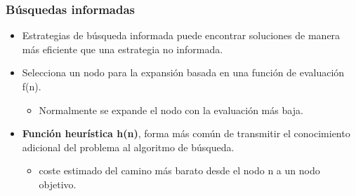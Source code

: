 \documentclass[xcolor=table]{beamer}
\begin{document}
\begin{frame} \frametitle{Búsquedas informadas} \small
\begin{itemize}
\item Estrategias de búsqueda informada puede encontrar soluciones de manera más eficiente que una estrategia no informada.

\item Selecciona un nodo para la expansión basada en una función de evaluación f(n).

\begin{itemize}
\item Normalmente se expande el nodo con la evaluación más baja.
\end{itemize}

\item \textbf{Función heurística h(n)}, forma más común de transmitir el conocimiento adicional del problema al algoritmo de búsqueda.


\begin{itemize}
\item coste estimado del camino más barato desde el nodo n a un nodo objetivo.
\end{itemize}

\end{itemize}

\end{frame} 

\end{document}

